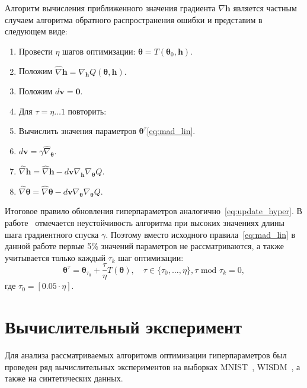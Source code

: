 \documentclass[12pt]{article}
\begin{document}
Алгоритм вычисления приближенного значения градиента $\nabla \mathbf{h}$ является частным случаем алгоритма обратного распространения ошибки и представим в следующем виде:
\begin{enumerate}
\item Провести $\eta$ шагов оптимизации: $\boldsymbol{\theta} = T(\boldsymbol{\theta}_0, \mathbf{h})$.
\item Положим $\hat{\nabla} \mathbf{h} = \nabla_\mathbf{h} Q(\boldsymbol{\theta}, \mathbf{h}).$ 
\item Положим $d\mathbf{v} = \mathbf{0}.$
\item Для $\tau = \eta \dots 1 $ повторить:
\item Вычислить значения параметров $\boldsymbol{\theta}^\tau$\eqref{eq:mad_lin}.
\item $d\mathbf{v} =  \gamma \hat{\nabla}_{\boldsymbol{\theta}}$.
\item $\hat{\nabla} \mathbf{h} =  \hat{\nabla} \mathbf{h} - d\mathbf{v}\nabla_{\mathbf{h}} \nabla_{\boldsymbol{\theta}} Q$.
\item $\hat{\nabla} \boldsymbol{\theta}  = \hat{\nabla} \boldsymbol{\theta}  - d\mathbf{v}\nabla_{\boldsymbol{\theta}} \nabla_{\boldsymbol{\theta}} Q$.
\end{enumerate}

Итоговое правило обновления гиперпараметров аналогично~\eqref{eq:update_hyper}.
В работе~\cite{hyper_mad} отмечается неустойчивость алгоритма при высоких значениях длины шага градиентного спуска $\gamma$. Поэтому вместо исходного правила~\eqref{eq:mad_lin} в данной работе первые 5\% значений параметров не рассматриваются, а также учитывается только каждый $\tau_k$ шаг оптимизации:
\begin{equation}
\label{eq:mad_lin2}
\boldsymbol{\theta}^\tau = \boldsymbol{\theta}_{\tau_0} + \frac{\tau}{\eta} T(\boldsymbol{\theta}), \quad \tau \in \{\tau_0,\dots,\eta\}, \tau \text{ mod } \tau_k = 0,
\end{equation}
где $\tau_0 = [0.05 \cdot \eta]$.


\section{Вычислительный эксперимент}
Для анализа рассматриваемых алгоритомв оптимизации гиперпараметров был проведен ряд вычислительных экспериментов на выборках MNIST~\cite{mnist}, WISDM~\cite{wisdm}, а также на синтетических данных.
\end{document}
